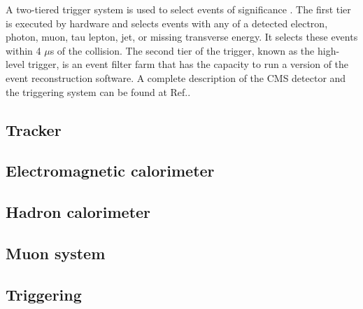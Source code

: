 A two-tiered trigger system is used to select events of significance \cite{CMS_trigger}. The first tier is executed by hardware and selects events with any of a detected electron, photon, muon, tau lepton, jet, or missing transverse energy. It selects these events within 4 \(\mu\)s of the collision. The second tier of the trigger, known as the high-level trigger, is an event filter farm that has the capacity to run a version of the event reconstruction software. A complete description of the CMS detector and the triggering system can be found at Ref.\cite{CMS_Setup}.

\subsection{Tracker}
\subsection{Electromagnetic calorimeter}
\subsection{Hadron calorimeter}
\subsection{Muon system}
\subsection{Triggering}

